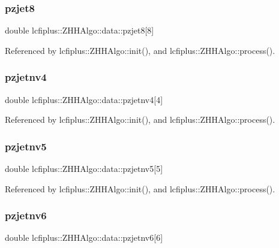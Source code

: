 \subsubsection{pzjet8}
{\footnotesize\ttfamily double lcfiplus\+::\+Z\+H\+H\+Algo\+::data\+::pzjet8[8]}



Referenced by lcfiplus\+::\+Z\+H\+H\+Algo\+::init(), and lcfiplus\+::\+Z\+H\+H\+Algo\+::process().

\mbox{\label{structlcfiplus_1_1ZHHAlgo_1_1data_a7a17844f8cea3b723ee859ecb9f992cc}} 
\subsubsection{pzjetnv4}
{\footnotesize\ttfamily double lcfiplus\+::\+Z\+H\+H\+Algo\+::data\+::pzjetnv4[4]}



Referenced by lcfiplus\+::\+Z\+H\+H\+Algo\+::init(), and lcfiplus\+::\+Z\+H\+H\+Algo\+::process().

\mbox{\label{structlcfiplus_1_1ZHHAlgo_1_1data_a67fa306339912e08284acf20ae72cb6d}} 
\subsubsection{pzjetnv5}
{\footnotesize\ttfamily double lcfiplus\+::\+Z\+H\+H\+Algo\+::data\+::pzjetnv5[5]}



Referenced by lcfiplus\+::\+Z\+H\+H\+Algo\+::init(), and lcfiplus\+::\+Z\+H\+H\+Algo\+::process().

\mbox{\label{structlcfiplus_1_1ZHHAlgo_1_1data_aa922b3dc3f7959cfba92fcc91556cf10}} 
\subsubsection{pzjetnv6}
{\footnotesize\ttfamily double lcfiplus\+::\+Z\+H\+H\+Algo\+::data\+::pzjetnv6[6]}



